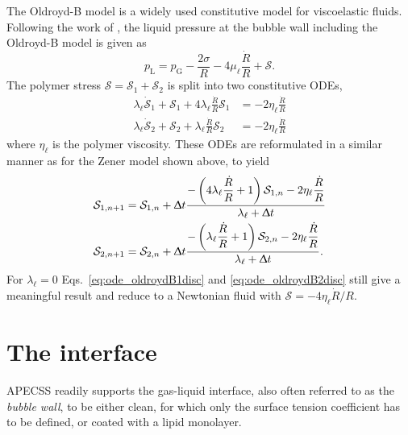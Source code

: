 The Oldroyd-B model is a widely used constitutive model for viscoelastic fluids. 
Following the work of \citet{Jimenez-Fernandez2005}, the liquid pressure at the bubble wall including the Oldroyd-B model is given as
\begin{equation}
     p_\text{L} = p_\text{G} - \frac{2 \sigma}{R} - 4 \mu_\ell \frac{\dot{R}}{R} + \mathcal{S} \label{eq:pL_OldroydB}.
\end{equation}
The polymer stress $\mathcal{S} = \mathcal{S}_1 + \mathcal{S}_2$ is split into two constitutive ODEs,
\begin{align}
    \lambda_\ell \dot{\mathcal{S}}_1 + \mathcal{S}_1 + 4 \lambda_\ell \frac{\dot{R}}{R} \mathcal{S}_1 &= - 2 \eta_\ell \frac{\dot{R}}{R}\\  
    \lambda_\ell \dot{\mathcal{S}}_2 + \mathcal{S}_2 +  \lambda_\ell \frac{\dot{R}}{R} \mathcal{S}_2 &= - 2 \eta_\ell \frac{\dot{R}}{R}
\end{align}
where $\eta_\ell$ is the polymer viscosity.
These ODEs are reformulated in a similar manner as for the Zener model shown above, to yield
\begin{align}
    \mathcal{S}_{1,n+1} &= \mathcal{S}_{1,n} + \Updelta t \frac{-\left(4 \lambda_\ell \dfrac{\dot{R}}{R}+1\right) \mathcal{S}_{1,n}- 2 \eta_\ell \dfrac{\dot{R}}{R}}{\lambda_\ell+\Updelta t} \label{eq:ode_oldroydB1disc} \\
    \mathcal{S}_{2,n+1} &= \mathcal{S}_{2,n} + \Updelta t \frac{-\left(\lambda_\ell \dfrac{\dot{R}}{R}+1\right) \mathcal{S}_{2,n}- 2 \eta_\ell \dfrac{\dot{R}}{R}}{\lambda_\ell+\Updelta t}.\label{eq:ode_oldroydB2disc}
\end{align}
For $\lambda_\ell = 0$ Eqs.~\eqref{eq:ode_oldroydB1disc} and \eqref{eq:ode_oldroydB2disc} still give a meaningful result and reduce to a Newtonian fluid with $\mathcal{S} = - 4 \eta_\ell \dot{R}/R$.

\section{The interface}
\label{sec:interface}

APECSS readily supports the gas-liquid interface, also often referred to as the \textit{bubble wall},  to be either clean, for which only the surface tension coefficient has to be defined, or coated with a lipid monolayer.

\vspace{0.8em}

